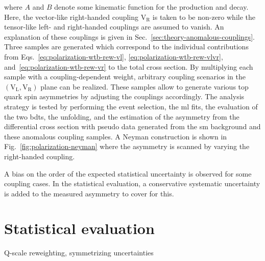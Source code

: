 where $A$ and $B$ denote some kinematic function for the production and decay. Here, the vector-like right-handed coupling $\mathrm{V}_\mathrm{R}$ is taken to be non-zero while the tensor-like left- and right-handed couplings are assumed to vanish. An explanation of these couplings is given in Sec.~\ref{sec:theory-anomalous-couplings}. Three samples are generated which correspond to the individual contributions from Eqs.~\ref{eq:polarization-wtb-rew-vl}, \ref{eq:polarization-wtb-rew-vlvr}, and~\ref{eq:polarization-wtb-rew-vr} to the total cross section. By multiplying each sample with a coupling-dependent weight, arbitrary coupling scenarios in the $(\mathrm{V}_\mathrm{L},\mathrm{V}_\mathrm{R})$ plane can be realized. These samples allow to generate various top quark spin asymmetries by adjusting the couplings accordingly. The analysis strategy is tested by performing the event selection, the \gls{ml} fits, the evaluation of the two \glspl{bdt}, the unfolding, and the estimation of the asymmetry from the differential cross section with pseudo data generated from the \gls{sm} background and these anomalous coupling samples. A Neyman construction is shown in Fig.~\ref{fig:polarization-neyman} where the asymmetry is scanned by varying the right-handed coupling.



A bias on the order of the expected statistical uncertainty is observed for some coupling cases. In the statistical evaluation, a conservative systematic uncertainty is added to the measured asymmetry to cover for this.



\section{Statistical evaluation}

Q-scale reweighting, symmetrizing  uncertainties

